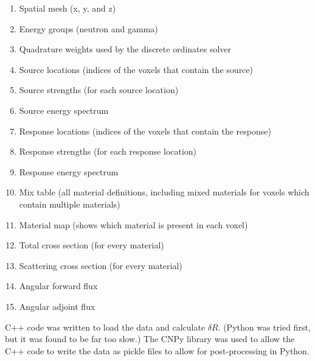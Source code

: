 \begin{enumerate}
  \item Spatial mesh (x, y, and z)
  \item Energy groups (neutron and gamma)
  \item Quadrature weights used by the discrete ordinates solver
  \item Source locations (indices of the voxels that contain the source)
  \item Source strengths (for each source location)
  \item Source energy spectrum
  \item Response locations (indices of the voxels that contain the response)
  \item Response strengths (for each response location)
  \item Response energy spectrum
  \item Mix table (all material definitions, including mixed materials for voxels which contain multiple materials)
  \item Material map (shows which material is present in each voxel)
  \item Total cross section (for every material)
  \item Scattering cross section (for every material)
  \item Angular forward flux
  \item Angular adjoint flux
\end{enumerate}

C++ code was written to load the data and calculate $\delta R$.
(Python was tried first, but it was found to be far too slow.)
The CNPy \cite{cnpy} library was used to allow the C++ code to write the data as pickle files to allow for post-processing in Python.
